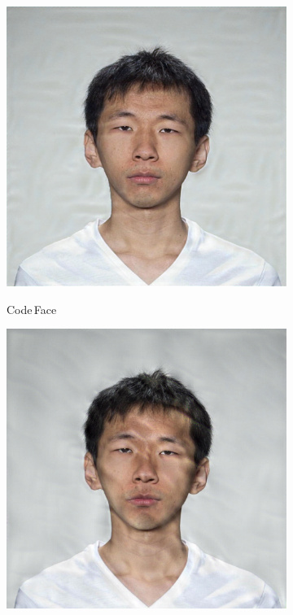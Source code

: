 \begin{figure}
\begin{subfigure}{0.23\textwidth}
        \includegraphics[width=\textwidth]{images/005_CodeFace_1.4.jpg}\\
        \caption{Code\,Face}\label{fig:steganography_b}
    \end{subfigure}
    \hfill
    \begin{subfigure}{0.23\textwidth}
        \centering
        \includegraphics[width=\textwidth]{images/005_RiemStega_1.4.jpg}\\

\end{subfigure}
\end{figure}
